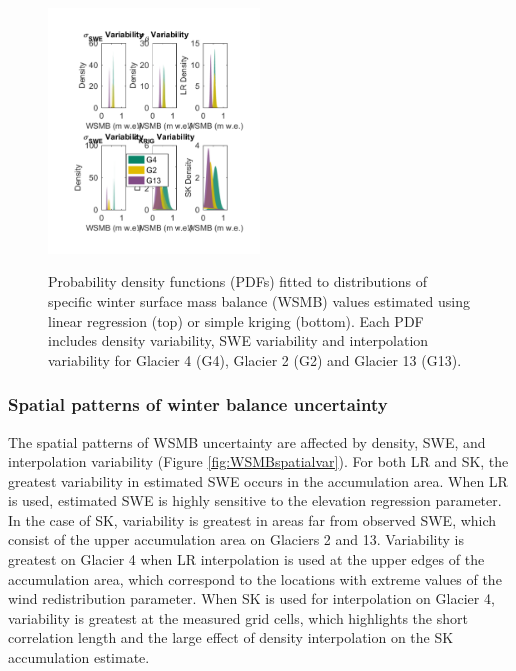 \documentclass[12pt]{article}
\begin{document}
\begin{figure}
	\centering
	\includegraphics[width =0.5\textwidth]{WSMBDist_full.pdf}\\
	\caption{Probability density functions (PDFs) fitted to distributions of specific winter surface mass balance (WSMB) values estimated using linear regression (top) or simple kriging (bottom). Each PDF includes density variability, SWE variability and interpolation variability for Glacier 4 (G4), Glacier 2 (G2) and Glacier 13 (G13).}
	\label{fig:WSMBDist_LRvsSK}
\end{figure}


\subsubsection{Spatial patterns of winter balance uncertainty}

The spatial patterns of WSMB uncertainty are affected by density, SWE, and interpolation variability (Figure \ref{fig:WSMBspatialvar}).  For both LR and SK, the greatest variability in estimated SWE occurs in the accumulation area. When LR is used, estimated SWE is highly sensitive to the elevation regression parameter. In the case of SK, variability is greatest in areas far from observed SWE, which consist of the upper accumulation area on Glaciers 2 and 13. Variability is greatest on Glacier 4 when LR interpolation is used at the upper edges of the accumulation area, which correspond to the locations with extreme values of the wind redistribution parameter. When SK is used for interpolation on Glacier 4, variability is greatest at the measured grid cells, which highlights the short correlation length and the large effect of density interpolation on the SK accumulation estimate.
\end{document}
